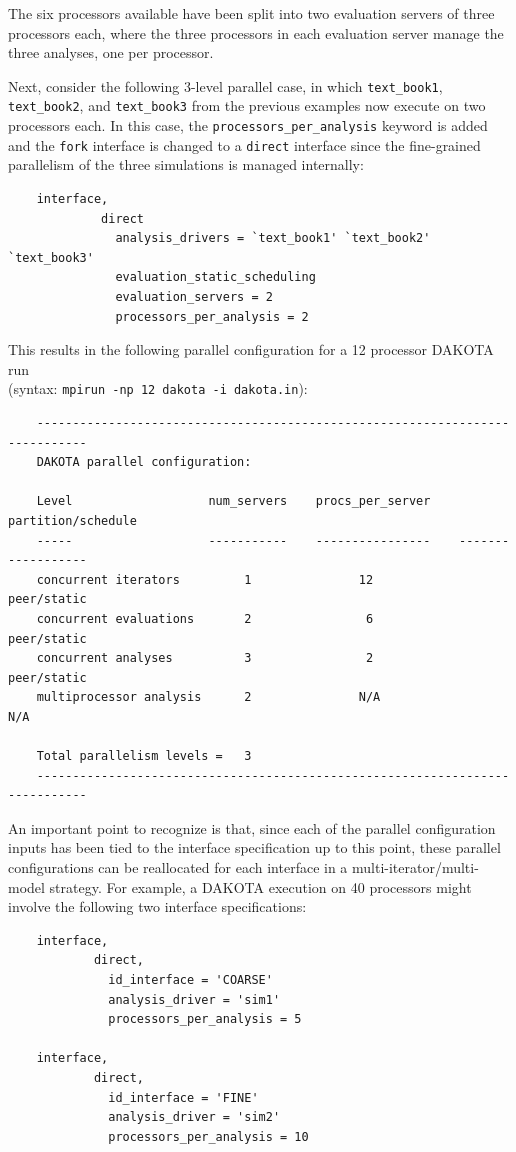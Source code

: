 The six processors available have been split into two evaluation
servers of three processors each, where the three processors in each
evaluation server manage the three analyses, one per processor.

Next, consider the following 3-level parallel case, in which
\texttt{text\_book1}, \texttt{text\_book2}, and \texttt{text\_book3}
from the previous examples now execute on two processors each. In this
case, the \texttt{processors\_per\_analysis} keyword is added and the
\texttt{fork} interface is changed to a \texttt{direct} interface
since the fine-grained parallelism of the three simulations is managed
internally:
\begin{small}
\begin{verbatim}
    interface,
             direct
               analysis_drivers = `text_book1' `text_book2' `text_book3'
               evaluation_static_scheduling
               evaluation_servers = 2
               processors_per_analysis = 2
\end{verbatim}
\end{small}

This results in the following parallel configuration for a 12
processor DAKOTA run \\
(syntax: \texttt{mpirun -np 12 dakota -i dakota.in}):
\begin{small}
\begin{verbatim}
    -----------------------------------------------------------------------------
    DAKOTA parallel configuration:

    Level                   num_servers    procs_per_server    partition/schedule
    -----                   -----------    ----------------    ------------------
    concurrent iterators         1               12              peer/static
    concurrent evaluations       2                6              peer/static
    concurrent analyses          3                2              peer/static
    multiprocessor analysis      2               N/A                N/A

    Total parallelism levels =   3
    -----------------------------------------------------------------------------
\end{verbatim}
\end{small}

An important point to recognize is that, since each of the parallel
configuration inputs has been tied to the interface specification up
to this point, these parallel configurations can be reallocated for
each interface in a multi-iterator/multi-model strategy. For example,
a DAKOTA execution on 40 processors might involve the following two
interface specifications:
\begin{small}
\begin{verbatim}
    interface,
            direct,
              id_interface = 'COARSE'
              analysis_driver = 'sim1'
              processors_per_analysis = 5

    interface,
            direct,
              id_interface = 'FINE'
              analysis_driver = 'sim2'
              processors_per_analysis = 10
\end{verbatim}
\end{small}


